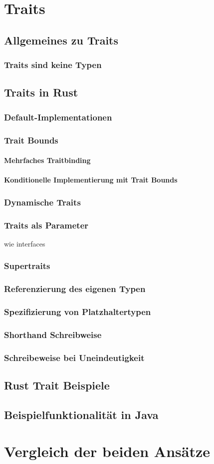 \documentclass[a4paper, 1ppt]{article}
\begin{document}
\section{Traits}
\subsection{Allgemeines zu Traits}
\subsubsection{Traits sind keine Typen}
\subsection{Traits in Rust}
\subsubsection{Default-Implementationen}
\subsubsection{Trait Bounds}
\paragraph{Mehrfaches Traitbinding}
\paragraph{Konditionelle Implementierung mit Trait Bounds}
\subsubsection{Dynamische Traits}
\subsubsection{Traits als Parameter}
wie interfaces
\subsubsection{Supertraits}
\subsubsection{Referenzierung des eigenen Typen}
\subsubsection{Spezifizierung von Platzhaltertypen}
\subsubsection{Shorthand Schreibweise}
\subsubsection{Schreibeweise bei Uneindeutigkeit}
\subsection{Rust Trait Beispiele}
\subsection{Beispielfunktionalität in Java}
\section{Vergleich der beiden Ansätze}



\end{document}
